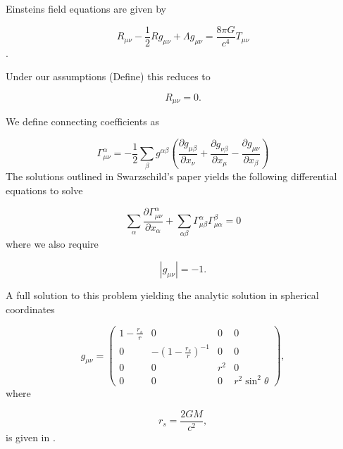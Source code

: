 \documentclass{CUP-JNL-DTM}%
\theoremstyle{definition}
\numberwithin{equation}{section}
\begin{document}
Einsteins field equations are given by 

\begin{equation}
    R_{\mu\nu} - \frac{1}{2}R g_{\mu\nu} + \Lambda g_{\mu\nu} = \frac{8 \pi G}{c^4}T_{\mu\nu}
    \label{eqn:EFE}
\end{equation}. 

Under our assumptions (Define) this reduces to 

\begin{equation}
    R_{\mu\nu} = 0. 
\end{equation}

We define connecting coefficients as 

\begin{equation}
    \Gamma^{\alpha}_{\mu\nu} = -\frac{1}{2}\sum_{\beta}g^{\alpha\beta}\left(\frac{\partial g_{\mu\beta}}{\partial x_{\nu}} + \frac{\partial g_{\nu\beta}}{\partial x_{\mu}} - \frac{\partial g_{\mu\nu}}{\partial x_{\beta}}\right)
    \label{eqn:ccs}
\end{equation}
The solutions outlined in Swarzschild's paper yields the following differential equations to solve

\begin{equation}
    \sum_{\alpha} \frac{\partial \Gamma^{\alpha}_{\mu\nu}}{\partial x_{\alpha}} + \sum_{\alpha\beta} \Gamma^{\alpha}_{\mu\beta} \Gamma^{\beta}_{\mu\alpha} = 0
\end{equation}
where we also require 

\begin{equation}
    |g_{\mu\nu}| = -1. 
\end{equation}

A full solution to this problem yielding the analytic solution in spherical coordinates

\begin{equation}
    g_{\mu\nu} = \begin{pmatrix}
        1 - \frac{r_s}{r} & 0 & 0 & 0 \\
        0 & -(1 - \frac{r_s}{r})^{-1} & 0 & 0 \\
        0 & 0 & r^2 & 0 \\
        0 & 0 & 0 & r^2\sin^2\theta
    \end{pmatrix},
\end{equation}
where 

\begin{equation}
    r_s = \frac{2GM}{c^2},
\end{equation}
is given in \cite{eigenchrisRelativity108aSchwarzschild}. 
\end{document}
